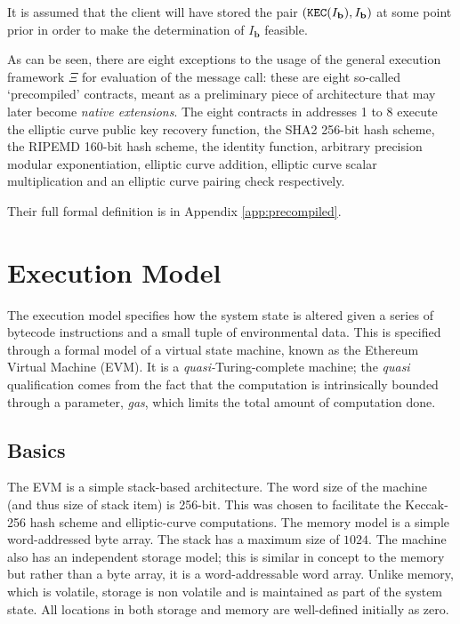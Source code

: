 \documentclass[9pt,oneside]{amsart}
\begin{document}
\begin{multicols}{2}
It is assumed that the client will have stored the pair $(\mathtt{\tiny KEC}(I_\mathbf{b}), I_\mathbf{b})$ at some point prior in order to make the determination of $I_\mathbf{b}$ feasible.

As can be seen, there are eight exceptions to the usage of the general execution framework $\Xi$ for evaluation of the message call: these are eight so-called `precompiled' contracts, meant as a preliminary piece of architecture that may later become \textit{native extensions}. The eight contracts in addresses 1 to 8 execute the elliptic curve public key recovery function, the SHA2 256-bit hash scheme, the RIPEMD 160-bit hash scheme, the identity function, arbitrary precision modular exponentiation, elliptic curve addition, elliptic curve scalar multiplication and an elliptic curve pairing check respectively.

Their full formal definition is in Appendix \ref{app:precompiled}.

\section{Execution Model} \label{ch:model}

The execution model specifies how the system state is altered given a series of bytecode instructions and a small tuple of environmental data. This is specified through a formal model of a virtual state machine, known as the Ethereum Virtual Machine (EVM). It is a \textit{quasi-}Turing-complete machine; the \textit{quasi} qualification comes from the fact that the computation is intrinsically bounded through a parameter, \textit{gas}, which limits the total amount of computation done.

\subsection{Basics}

The EVM is a simple stack-based architecture. The word size of the machine (and thus size of stack item) is 256-bit. This was chosen to facilitate the Keccak-256 hash scheme and elliptic-curve computations. The memory model is a simple word-addressed byte array. The stack has a maximum size of $1024$. The machine also has an independent storage model; this is similar in concept to the memory but rather than a byte array, it is a word-addressable word array. Unlike memory, which is volatile, storage is non volatile and is maintained as part of the system state. All locations in both storage and memory are well-defined initially as zero.


\end{multicols}
\end{document}
